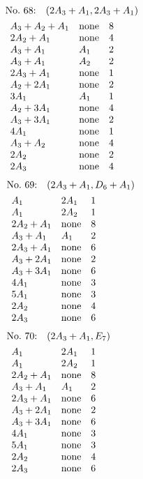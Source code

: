 \begin{align*}
&\hbox to 4cm {\textrm{No.~68:}\quad$(2A_{3}+A_{1}, 2A_{3}+A_{1})$\hss}\\ 
&\begin{array}{lll}
A_{3}+A_{2}+A_{1} & \none & 8\\
2A_{2}+A_{1} & \none & 4\\
A_{3}+A_{1} & A_{1} & 2\\
A_{3}+A_{1} & A_{2} & 2\\
2A_{3}+A_{1} & \none & 1\\
A_{2}+2A_{1} & \none & 2\\
3A_{1} & A_{1} & 1\\
A_{2}+3A_{1} & \none & 4\\
A_{3}+3A_{1} & \none & 2\\
4A_{1} & \none & 1\\
A_{3}+A_{2} & \none & 4\\
2A_{2} & \none & 2\\
2A_{3} & \none & 4\\
\end{array}
\end{align*}
%
%
\begin{align*}
&\hbox to 4cm {\textrm{No.~69:}\quad$(2A_{3}+A_{1}, D_{6}+A_{1})$\hss}\\ 
&\begin{array}{lll}
A_{1} & 2A_{1} & 1\\
A_{1} & 2A_{2} & 1\\
2A_{2}+A_{1} & \none & 8\\
A_{3}+A_{1} & A_{1} & 2\\
2A_{3}+A_{1} & \none & 6\\
A_{3}+2A_{1} & \none & 2\\
A_{3}+3A_{1} & \none & 6\\
4A_{1} & \none & 3\\
5A_{1} & \none & 3\\
2A_{2} & \none & 4\\
2A_{3} & \none & 6\\
\end{array}
\end{align*}
%
%
\begin{align*}
&\hbox to 4cm {\textrm{No.~70:}\quad$(2A_{3}+A_{1}, E_{7})$\hss}\\ 
&\begin{array}{lll}
A_{1} & 2A_{1} & 1\\
A_{1} & 2A_{2} & 1\\
2A_{2}+A_{1} & \none & 8\\
A_{3}+A_{1} & A_{1} & 2\\
2A_{3}+A_{1} & \none & 6\\
A_{3}+2A_{1} & \none & 2\\
A_{3}+3A_{1} & \none & 6\\
4A_{1} & \none & 3\\
5A_{1} & \none & 3\\
2A_{2} & \none & 4\\
2A_{3} & \none & 6\\
\end{array}
\end{align*}
